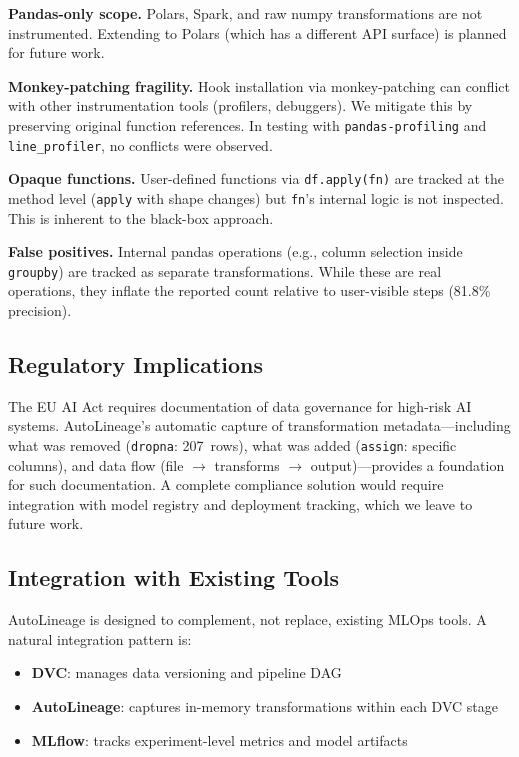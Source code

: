 \documentclass[10pt,twocolumn]{article}
\begin{document}
\textbf{Pandas-only scope.} Polars, Spark, and raw numpy transformations are not instrumented. Extending to Polars (which has a different API surface) is planned for future work.

\textbf{Monkey-patching fragility.} Hook installation via monkey-patching can conflict with other instrumentation tools (profilers, debuggers). We mitigate this by preserving original function references. In testing with \texttt{pandas-profiling} and \texttt{line\_profiler}, no conflicts were observed.

\textbf{Opaque functions.} User-defined functions via \texttt{df.apply(fn)} are tracked at the method level (\texttt{apply} with shape changes) but \texttt{fn}'s internal logic is not inspected. This is inherent to the black-box approach.

\textbf{False positives.} Internal pandas operations (e.g., column selection inside \texttt{groupby}) are tracked as separate transformations. While these are real operations, they inflate the reported count relative to user-visible steps (81.8\% precision).

\subsection{Regulatory Implications}

The EU AI Act requires documentation of data governance for high-risk AI systems. AutoLineage's automatic capture of transformation metadata---including what was removed (\texttt{dropna}: 207~rows), what was added (\texttt{assign}: specific columns), and data flow (file $\to$ transforms $\to$ output)---provides a foundation for such documentation. A complete compliance solution would require integration with model registry and deployment tracking, which we leave to future work.

\subsection{Integration with Existing Tools}

AutoLineage is designed to complement, not replace, existing MLOps tools. A natural integration pattern is:

\begin{itemize}[leftmargin=*, nosep]
  \item \textbf{DVC}: manages data versioning and pipeline DAG
  \item \textbf{AutoLineage}: captures in-memory transformations within each DVC stage
  \item \textbf{MLflow}: tracks experiment-level metrics and model artifacts
\end{itemize}
\end{document}
